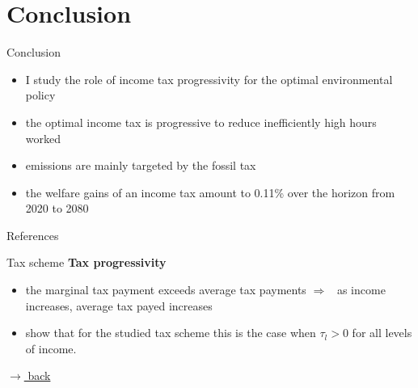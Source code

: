 \documentclass[11pt,aspectratio=169]{beamer}
\newcommand{\ar}{$\Rightarrow$ \ }
\begin{document}
\section*{Conclusion}
\begin{frame}{Conclusion}
	\begin{itemize}[<+-| alert@+>]
	\item I study the role of income tax progressivity for the optimal environmental policy %
	\vspace{3mm}
	\item the optimal income tax is progressive to reduce inefficiently high
	hours worked
	\vspace{3mm}
	\item emissions are mainly targeted by the fossil tax
		\vspace{3mm}
	\item the welfare gains of an income tax amount to 0.11\%  over the horizon from 2020 to 2080 %
   \vspace{3mm}
\end{itemize}
\end{frame}
\begin{frame}[shrink]{References}
	
	
	
\end{frame}



\appendix

\begin{frame}{Tax scheme}
	\hypertarget{taxsc}{}
\textbf{Tax progressivity}
\begin{itemize}
	\item the marginal tax payment exceeds average tax payments \ar as income increases, average tax payed increases
	\item \cite{Heathcote2017OptimalFramework} show that for the studied tax scheme this is the case when $\tau_l>0$ for all levels of income. 
\end{itemize}

\vspace{0mm}
\hfill
\hyperlink{backhh}{\tiny{$\rightarrow$ back}}
\end{frame}
\end{document}
